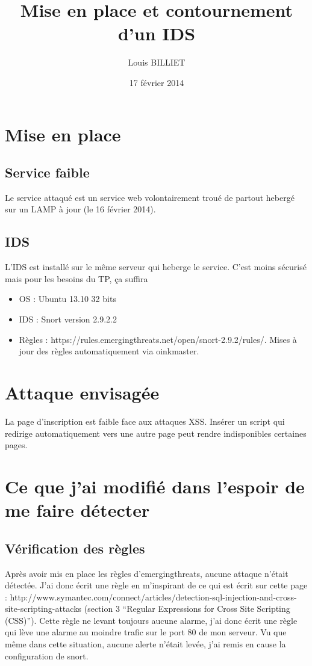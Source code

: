 \documentclass[oneside,10pt]{article}
\begin{document}
\title{Mise en place et contournement d'un IDS}
\author{Louis BILLIET}
\date{17 f\'evrier 2014}
\maketitle

\section{Mise en place}
\subsection{Service faible}
Le service attaqu\'e est un service web volontairement trou\'e de partout heberg\'e sur un LAMP \`a jour (le 16 f\'evrier 2014).

\subsection{IDS}
L'IDS est install\'e sur le m\^eme serveur qui heberge le service.
C'est moins s\'ecuris\'e mais pour les besoins du TP, \c ca suffira
\begin{itemize}
\item OS : Ubuntu 13.10 32 bits
\item IDS : Snort version 2.9.2.2
\item R\`egles : https://rules.emergingthreats.net/open/snort-2.9.2/rules/.
Mises \`a jour des r\`egles automatiquement via oinkmaster.
\end{itemize}

\section{Attaque envisag\'ee}
La page d'inscription est faible face aux attaques XSS.
Ins\'erer un script qui redirige automatiquement vers une autre page peut rendre indisponibles certaines pages.

\section{Ce que j'ai modifi\'e dans l'espoir de me faire d\'etecter}
\subsection{V\'erification des r\`egles}
Apr\`es avoir mis en place les r\`egles d'emergingthreats, aucune attaque n'\'etait d\'etect\'ee.
J'ai donc \'ecrit une r\`egle en m'inspirant de ce qui est \'ecrit sur cette page : http://www.symantec.com/connect/articles/detection-sql-injection-and-cross-site-scripting-attacks (section 3 ``Regular Expressions for Cross Site Scripting (CSS)'').
Cette r\`egle ne levant toujours aucune alarme, j'ai donc \'ecrit une r\`egle qui l\`eve une alarme au moindre trafic sur le port 80 de mon serveur.
Vu que m\^eme dans cette situation, aucune alerte n'\'etait lev\'ee, j'ai remis en cause la configuration de snort.
\end{document}
